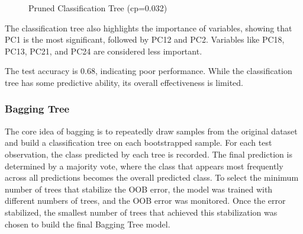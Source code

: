 \documentclass[
  12pt,
  letterpaper,
  DIV=11,
  numbers=noendperiod]{scrartcl}
\begin{document}
\begin{figure}


\caption{\label{fig-tree2}Pruned Classification Tree (cp=0.032)}

\end{figure}%

The classification tree also highlights the importance of variables,
showing that PC1 is the most significant, followed by PC12 and PC2.
Variables like PC18, PC13, PC21, and PC24 are considered less important.

The test accuracy is 0.68, indicating poor performance. While the
classification tree has some predictive ability, its overall
effectiveness is limited.

\subsubsection{Bagging Tree}\label{bagging-tree}

The core idea of bagging is to repeatedly draw samples from the original
dataset and build a classification tree on each bootstrapped sample. For
each test observation, the class predicted by each tree is recorded. The
final prediction is determined by a majority vote, where the class that
appears most frequently across all predictions becomes the overall
predicted class. To select the minimum number of trees that stabilize
the OOB error, the model was trained with different numbers of trees,
and the OOB error was monitored. Once the error stabilized, the smallest
number of trees that achieved this stabilization was chosen to build the
final Bagging Tree model.
\end{document}
